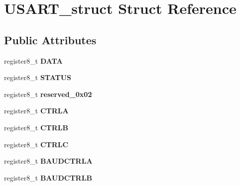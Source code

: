 \hypertarget{struct_u_s_a_r_t__struct}{}\section{U\+S\+A\+R\+T\+\_\+struct Struct Reference}
\label{struct_u_s_a_r_t__struct}
\subsection*{Public Attributes}
\begin{DoxyCompactItemize}
\item 
register8\+\_\+t {\bfseries D\+A\+TA}\hypertarget{struct_u_s_a_r_t__struct_ab03b25929825b988cf5bc0287ee3ce74}{}\label{struct_u_s_a_r_t__struct_ab03b25929825b988cf5bc0287ee3ce74}

\item 
register8\+\_\+t {\bfseries S\+T\+A\+T\+US}\hypertarget{struct_u_s_a_r_t__struct_a4f322c93a676dd8b8cec47b8439c0391}{}\label{struct_u_s_a_r_t__struct_a4f322c93a676dd8b8cec47b8439c0391}

\item 
register8\+\_\+t {\bfseries reserved\+\_\+0x02}\hypertarget{struct_u_s_a_r_t__struct_ac808256f59ffae1393d381b975d5ed62}{}\label{struct_u_s_a_r_t__struct_ac808256f59ffae1393d381b975d5ed62}

\item 
register8\+\_\+t {\bfseries C\+T\+R\+LA}\hypertarget{struct_u_s_a_r_t__struct_ad84de636c48d65671de507feb013e6d9}{}\label{struct_u_s_a_r_t__struct_ad84de636c48d65671de507feb013e6d9}

\item 
register8\+\_\+t {\bfseries C\+T\+R\+LB}\hypertarget{struct_u_s_a_r_t__struct_aa3385a22a6299a55d51155f94943e2d0}{}\label{struct_u_s_a_r_t__struct_aa3385a22a6299a55d51155f94943e2d0}

\item 
register8\+\_\+t {\bfseries C\+T\+R\+LC}\hypertarget{struct_u_s_a_r_t__struct_aee1ddff9650e8f97f0c76c525a7ed20b}{}\label{struct_u_s_a_r_t__struct_aee1ddff9650e8f97f0c76c525a7ed20b}

\item 
register8\+\_\+t {\bfseries B\+A\+U\+D\+C\+T\+R\+LA}\hypertarget{struct_u_s_a_r_t__struct_a156478eba14caaede2f2af05df07c220}{}\label{struct_u_s_a_r_t__struct_a156478eba14caaede2f2af05df07c220}

\item 
register8\+\_\+t {\bfseries B\+A\+U\+D\+C\+T\+R\+LB}\hypertarget{struct_u_s_a_r_t__struct_abed00969aec542e5baf590eb9afbd6fa}{}\label{struct_u_s_a_r_t__struct_abed00969aec542e5baf590eb9afbd6fa}

\end{DoxyCompactItemize}


